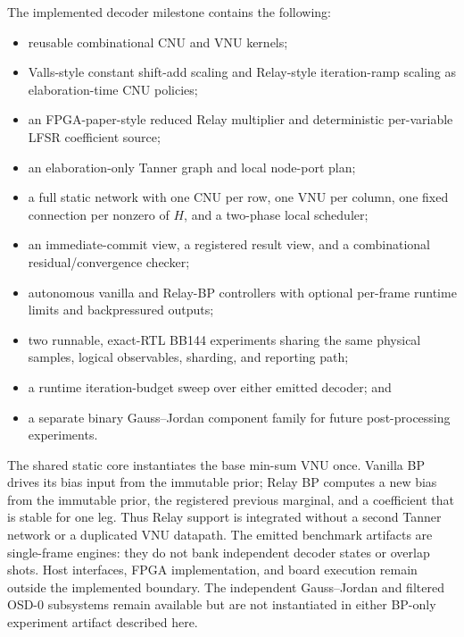 \documentclass[10pt,conference]{IEEEtran}
\begin{document}
The implemented decoder milestone contains the following:
\begin{itemize}
  \item reusable combinational CNU and VNU kernels;
  \item Valls-style constant shift-add scaling and Relay-style iteration-ramp
        scaling as elaboration-time CNU policies;
  \item an FPGA-paper-style reduced Relay multiplier and deterministic
        per-variable LFSR coefficient source;
  \item an elaboration-only Tanner graph and local node-port plan;
  \item a full static network with one CNU per row, one VNU per column, one
        fixed connection per nonzero of $H$, and a two-phase local scheduler;
  \item an immediate-commit view, a registered result view, and a combinational
        residual/convergence checker;
  \item autonomous vanilla and Relay-BP controllers with optional per-frame
        runtime limits and backpressured outputs;
  \item two runnable, exact-RTL BB144 experiments sharing the same physical
        samples, logical observables, sharding, and reporting path;
  \item a runtime iteration-budget sweep over either emitted decoder; and
  \item a separate binary Gauss--Jordan component family for future
        post-processing experiments.
\end{itemize}
The shared static core instantiates the base min-sum VNU once.  Vanilla BP
drives its bias input from the immutable prior; Relay BP computes a new bias
from the immutable prior, the registered previous marginal, and a coefficient
that is stable for one leg.  Thus Relay support is integrated without a second
Tanner network or a duplicated VNU datapath.  The emitted benchmark artifacts
are single-frame engines: they do not bank independent decoder states or overlap
shots.  Host interfaces, FPGA implementation, and board execution remain
outside the implemented boundary.  The independent Gauss--Jordan and filtered
OSD-0 subsystems remain available but are not instantiated in either BP-only
experiment artifact described here.
\end{document}
